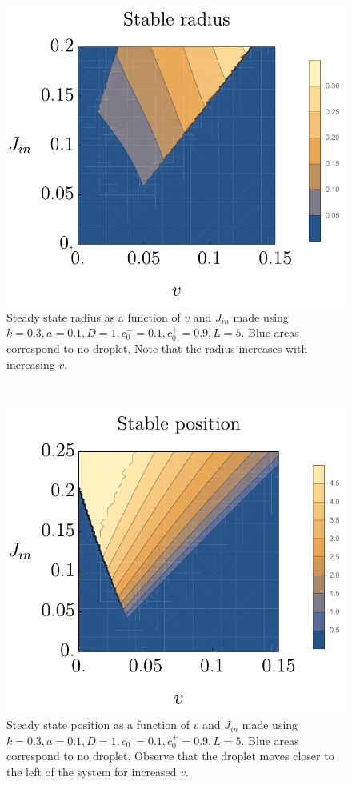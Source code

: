\documentclass{Dissertate}
\let\origfigure\figure
\let\endorigfigure\endfigure
\renewenvironment{figure}[1][2] {
    \expandafter\origfigure\expandafter[H]
} {
    \endorigfigure
}
\begin{document}
\begin{figure}
    \centering
    \begin{subfigure}[t]{0.5\textwidth}
        \centering
        \includegraphics{source/figures/pdf/Rstable.pdf}
        \caption{Steady state radius as a function of \(v\) and \(J_{in}\) made
using \(k=0.3, a=0.1, D=1 ,c_0^-=0.1,c_0^+=0.9, L=5\). Blue areas
correspond to no droplet. Note that the radius increases with increasing $v$.\label{fig:rstabledecay}}
    \end{subfigure}%
    ~ 
    \begin{subfigure}[t]{0.5\textwidth}
        \centering
        \includegraphics{source/figures/pdf/Xstable.pdf}
        \caption{Steady state position as a function of \(v\) and \(J_{in}\)
made using \(k=0.3, a=0.1, D=1 ,c_0^-=0.1,c_0^+=0.9, L=5\). Blue areas
correspond to no droplet. Observe that the droplet moves closer to the left of the system for increased $v$.\label{fig:xstabledecay}}
    \end{subfigure}
    \caption{}
\end{figure}
\end{document}
